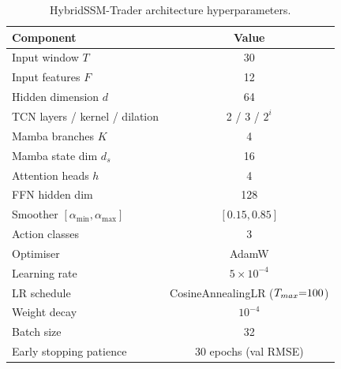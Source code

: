\documentclass[runningheads]{llncs}
\begin{document}
\begin{table}[h]
\centering
\caption{HybridSSM-Trader architecture hyperparameters.}
\label{tab:arch}
\begin{tabular}{lc}
\toprule
\textbf{Component} & \textbf{Value} \\
\midrule
Input window $T$ & 30 \\
Input features $F$ & 12 \\
Hidden dimension $d$ & 64 \\
TCN layers / kernel / dilation & 2 / 3 / $2^i$ \\
Mamba branches $K$ & 4 \\
Mamba state dim $d_s$ & 16 \\
Attention heads $h$ & 4 \\
FFN hidden dim & 128 \\
Smoother $[\alpha_{\min}, \alpha_{\max}]$ & $[0.15, 0.85]$ \\
Action classes & 3 \\
\midrule
Optimiser & AdamW \\
Learning rate & $5 \times 10^{-4}$ \\
LR schedule & CosineAnnealingLR ($T_{\\max}{=}100$) \\
Weight decay & $10^{-4}$ \\
Batch size & 32 \\
Early stopping patience & 30 epochs (val RMSE) \\
\bottomrule
\end{tabular}
\end{table}
\end{document}
